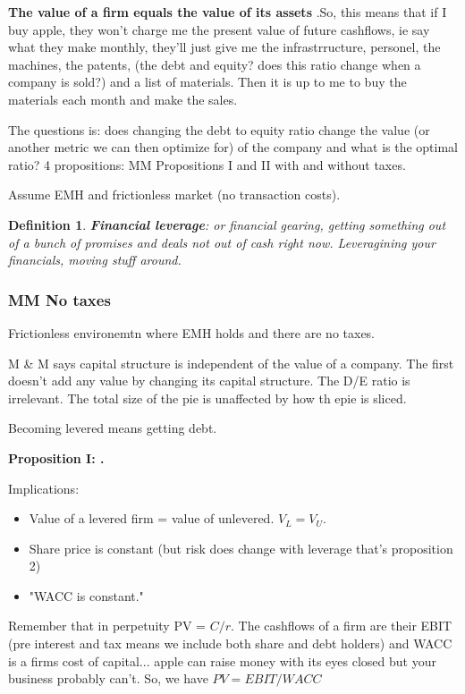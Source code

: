 \documentclass{article}
\newtheorem{definition}{Definition}
\begin{document}
\textbf{The value of a firm equals the value of its assets} .So, this means that if I buy apple, they won't charge me the present value of future cashflows, ie say what they make monthly, they'll just give me the infrastrructure, personel, the machines, the patents, (the debt and equity? does this ratio change when a company is sold?) and a list of materials. Then it is up to me to buy the materials each month and make the sales. 

The questions is: does changing the debt to equity ratio change the value (or another metric we can then optimize for) of the company and what is the optimal ratio? 4 propositions: MM Propositions I and II with and without taxes.

Assume EMH and frictionless market (no transaction costs). 

\begin{definition}
\textbf{Financial leverage}: or financial gearing, getting something out of a bunch of promises and deals not out of cash right now. Leveragining your financials, moving stuff around. 
\end{definition}

\subsubsection{MM No taxes}
Frictionless environemtn where EMH holds and there are no taxes. 

M \& M says capital structure is independent of the  value of a company. The first doesn't add any value by changing its capital structure. The D/E ratio is irrelevant. The total size of the pie is unaffected by how th epie is sliced. 

Becoming levered means getting debt. 

\textbf{Proposition I: .}

Implications:
\begin{itemize}
\item Value of a levered firm = value of unlevered. $ V_L = V_U $.
\item Share price is constant (but risk does change with leverage that's proposition 2)
\item "WACC is constant."
\end{itemize}
Remember that in perpetuity PV =  $C/r$. The cashflows of a firm are their EBIT (pre interest and tax means we include both share and debt holders) and WACC is a firms cost of capital... apple can raise money with its eyes closed but your business probably can't. So, we have $PV = EBIT/WACC$
\end{document}
